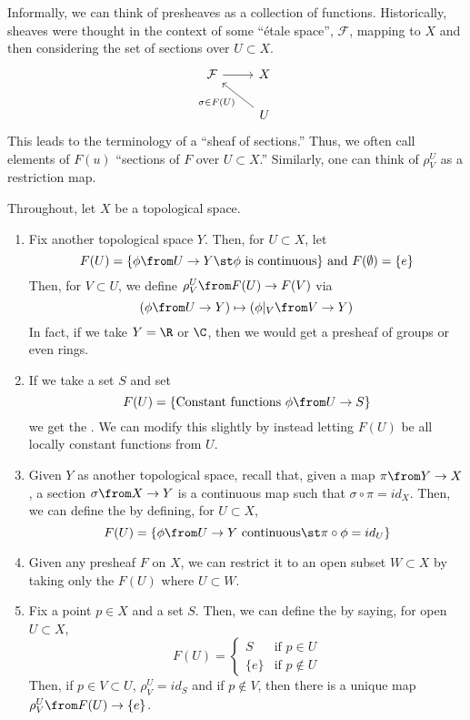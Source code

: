 \documentclass[11pt,leqno,oneside]{amsbook}
\renewcommand{\F}{F} %
\newcommand{\cF}{\mathcal{F}}
\numberwithin{thm}{section}
\begin{document}
Informally, we can think of presheaves as a collection of
functions. Historically, sheaves were thought in the context of some
``\'{e}tale space'', \(\cF\), mapping to \(X\) and then considering
the set of sections over \(U \subset X\). \[ 
  \begin{tikzcd}
    \cF \ar[r] & X\\
    & \ar[ul, "\sigma \in \F(U)"] U
  \end{tikzcd}
\]
This leads to the terminology of a ``sheaf of sections.'' Thus, we
often call elements of \(\F(u)\) ``sections of \(\F\) over \(U \subset
X\).'' Similarly, one can think of \(\rho_V^U\) as a restriction map.
\begin{example}
  Throughout, let \(X\) be a topological space.
  \begin{enumerate}
  \item Fix another topological space \(Y\). Then, for \(U \subset
    X\), let \[
      F(U) = \{\phi \from U \to Y \st \phi \text{ is continuous} \}
      \text{ and } F(\emptyset) = \{e\} 
    \]
    Then, for \(V \subset U\), we define \(\rho_V^U \from F(U) \to
    F(V)\) via \[
      (\phi \from U \to Y) \mapsto (\phi |_V \from V \to Y)
    \]
    In fact, if we take \(Y=\R\) or \(\C\), then we would get a
    presheaf of groups or even rings.
  \item If we take a set \(S\) and set \[
      F(U) = \{\text{Constant functions }\phi \from U \to S\}
    \]
    we get the . We can modify this slightly by
    instead letting \(F(U)\) be all locally constant functions from
    \(U\).
  \item Given \(Y\) as another topological space, recall that, given a
    map \(\pi \from Y \to X\), a section \(\sigma \from X \to Y\) is a
    continuous map such that \(\sigma \circ \pi = id_X\). Then, we can
    define the  by defining, for
    \(U \subset X\), \[
      F(U) = \{\phi \from U \to Y \text{ continuous} \st \pi \circ
      \phi = id_U\}
    \]
  \item Given any presheaf \(F\) on \(X\), we can restrict it to an
    open subset \(W \subset X\) by taking only the \(F(U)\) where \(U
    \subset W\).
  \item Fix a point \(p \in X\) and a set \(S\). Then, we can define
    the  by saying, for open \(U \subset
    X\), \[
      F(U) =
      \begin{cases}
        S & \text{if }p \in U\\
        \{e\} & \text{if }p \not\in U
      \end{cases}
    \]
    Then, if \(p \in V \subset U\), \(\rho^U_V = id_S\) and if \(p
    \not \in V\), then there is a unique map \(\rho^U_V \from F(U) \to
    \{e\}\).
  \end{enumerate}
\end{example}
\end{document}
